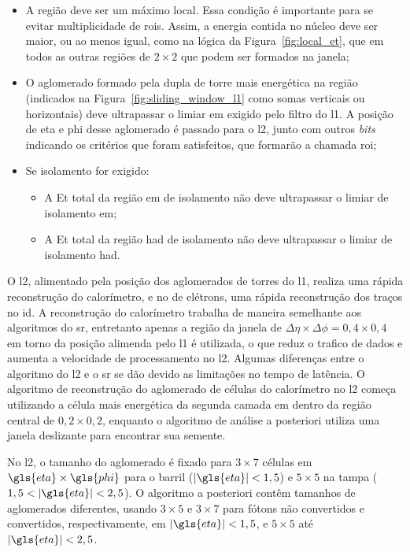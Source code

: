 \begin{itemize}
\item A região deve ser um máximo local. Essa condição é importante para se
evitar multiplicidade de \glspl{roi}. Assim, a energia contida no núcleo deve ser
maior, ou ao menos igual, como na lógica da Figura~\ref{fig:local_et}, 
que em todos as outras regiões de $2\times2$ que podem ser formados na
janela;
\item O aglomerado formado pela dupla de torre mais energética na região
(indicados na Figura~\ref{fig:sliding_window_l1} como somas verticais ou horizontais) deve ultrapassar o limiar
\gls{em} exigido pelo filtro do \gls{l1}. A posição de \gls{eta} e \gls{phi} desse aglomerado é passado
para o \gls{l2}, junto com outros \emph{bits} indicando os critérios que foram
satisfeitos, que formarão a chamada \gls{roi};
\item Se isolamento for exigido: 
\begin{itemize}
\item A \gls{Et} total da região \gls{em} de
isolamento não deve ultrapassar o limiar de isolamento \gls{em};
\item A \gls{Et} total da região \gls{had} de isolamento não deve ultrapassar o
limiar de isolamento \gls{had}.
\end{itemize}
\end{itemize}


O \gls{l2}, alimentado pela posição dos
aglomerados de torres do \gls{l1}, realiza uma rápida reconstrução do
calorímetro, e no de elétrons, uma rápida reconstrução dos traços no \gls{id}. A
reconstrução do calorímetro trabalha de maneira semelhante aos algoritmos do
\gls{sr}, entretanto apenas a região da janela de $\Delta\eta\times\Delta\phi =
0,4 \times 0,4$ em torno da posição alimenda pelo \gls{l1} é utilizada, o que
reduz o trafico de dados e aumenta a velocidade de processamento no \gls{l2}.
Algumas diferenças entre o algoritmo do \gls{l2} e o \gls{sr} se dão devido as
limitações no tempo de latência. O algoritmo de reconstrução do aglomerado de
células do calorímetro no \gls{l2} começa utilizando a célula mais energética da
segunda camada \gls{em} dentro da região central de $0,2 \times 0,2$, enquanto o
algoritmo de análise a posteriori utiliza uma janela deslizante para encontrar
sua semente.

No \gls{l2}, o tamanho do aglomerado é fixado para $3
\times 7$ células em $\gls{eta} \times \gls{phi}$ para o barril ($|\gls{eta}|<1,5$) e 
$5 \times 5$ na tampa ($1,5<|\gls{eta}|<2,5$). O
algoritmo a posteriori contêm tamanhos de aglomerados diferentes, usando
$3\times5$ e $3\times7$ para fótons não convertidos e convertidos,
respectivamente, em $|\gls{eta}|<1,5$, e $5\times5$ até $|\gls{eta}|<2,5$.

